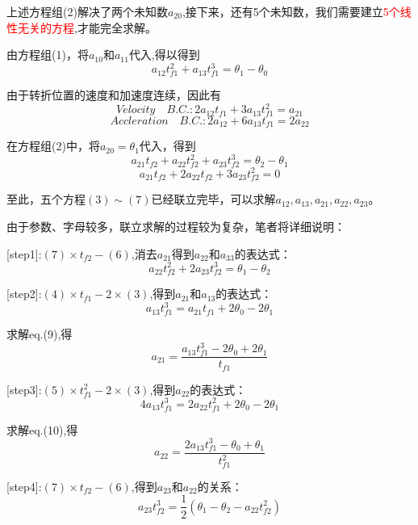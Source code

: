\documentclass{ctexart}
\begin{document}
上述方程组(2)解决了两个未知数$a_{20}$,接下来，还有5个未知数，我们需要建立\textcolor{red}{5个线性无关的方程},才能完全求解。

由方程组(1)，将$a_{10}$和$a_{11}$代入,得以得到
\begin{equation}
	a_{12}t_{f1}^2+a_{13}t_{f1}^3=\theta_1-\theta_0
\end{equation}

由于转折位置的速度和加速度连续，因此有
\begin{equation}
	Velocity \quad B.C. : 2a_{12}t_{f1}+3a_{13}t_{f1}^2=a_{21}
\end{equation}
\begin{equation}
	Accleration\quad  B.C. : 2a_{12}+6a_{13}t_{f1}=2a_{22}
\end{equation}

在方程组(2)中，将$a_{20}=\theta_1$代入，得到
\begin{equation}
	a_{21}t_{f2}+a_{22}t_{f2}^2+a_{23}t_{f2}^3=\theta_2-\theta_1
\end{equation}
\begin{equation}
	a_{21}t_{f2}+2a_{22}t_{f2}+3a_{23}t_{f2}^2=0
\end{equation}

至此，五个方程$(3)\sim (7)$已经联立完毕，可以求解$a_{12},a_{13},a_{21},a_{22},a_{23}$。

由于参数、字母较多，联立求解的过程较为复杂，笔者将详细说明：

[step1]:$(7)\times t_{f2} - (6)$,消去$a_{21}$得到$a_{22}$和$a_33$的表达式：	
\begin{equation}
	a_{22}t_{f2}^2+2a_{23}t_{f2}^3=\theta_1-\theta_2
\end{equation}

[step2]:$(4)\times t_{f1} - 2\times (3)$,得到$a_{21}$和$a_{13}$的表达式：
\begin{equation}
	a_{13}t_{f1}^3=a_{21}t_{f1}+2\theta_0-2\theta_1
\end{equation}

求解eq.(9),得
$$
a_{21}=\frac{a_{13}t_{f1}^3-2\theta_0+2\theta_1}{t_{f1}}
$$

[step3]:$(5)\times t_{f1}^2 - 2\times (3)$,得到$a_{22}$的表达式：
\begin{equation}
	4a_{13}t_{f1}^3=2a_{22}t_{f1}^2+2\theta_0-2\theta_1
\end{equation}

求解eq.(10),得
$$
a_{22}=\frac{2a_{13}t_{f1}^3-\theta_0+\theta_1}{t_{f1}^2}
$$

[step4]:$(7)\times t_{f2} - (6)$,得到$a_{23}$和$a_{22}$的关系：
\begin{equation}
	a_{23} t_{f2}^3 = \frac{1}{2}(\theta_1-\theta_2-a_{22}t_{f2}^2)
\end{equation}
\end{document}
